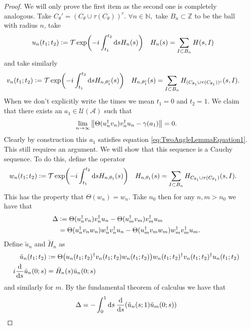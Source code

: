 \documentclass[12pt,a4paper,twoside]{article}
\renewcommand{\d}{\text{d}}
\newcommand{\defeq}{\vcentcolon=}
\let\originalleft\left
\let\originalright\right
\renewcommand{\left}{\mathopen{}\mathclose\bgroup\originalleft}
\renewcommand{\right}{\aftergroup\egroup\originalright}
\newcommand{\UU}{\mathcal U}
\newcommand{\ZZ}{\mathbb Z}
\renewcommand{\AA}{\mathcal A}
\newcommand{\NN}{\mathbb{N}}
\theoremstyle{definition}
\numberwithin{equation}{section}
\begin{document}
\begin{proof}
	We will only prove the first item as the second one is completely analogous. Take $C_\theta'=(C_\theta\cup\tau(C_\theta))^c.$ $\forall n\in\NN,$ take $B_n\subset\ZZ$ to be the ball with radius $n$, take
	\begin{align}
		u_n(t_1;t_2)&\defeq \mathcal{T}\exp(-i\int_{t_1}^{t_2} \d s H_n(s))&H_n(s)&=\sum_{I\subset B_n}H(s,I)
	\end{align}
	and take similarly
	\begin{align}
	v_n(t_1;t_2)&\defeq \mathcal{T}\exp(-i\int_{t_1}^{t_2} \d s H_{n,\theta_1^c}(s) )&H_{n,\theta_1^c}(s)&=\sum_{I\subset B_n}H_{(C_{\theta_1}\cup \tau(C_{\theta_1}))^c}(s,I).
	\end{align}
	When we don't explicitly write the times we mean $t_1=0$ and $t_2=1$. We claim that there exists an $a_1\in\UU(\AA)$ such that
	\begin{equation}
		\lim_{n\rightarrow\infty}\norm{\Theta(u_n^\dagger v_n)v_n^\dagger u_n-\gamma(a_1)}=0.
	\end{equation}
	Clearly by construction this $a_1$ satisfies equation \eqref{eq:TwoAngleLemmaEquation1}. {\color{red}This still requires an argument.} We will show that this sequence is a Cauchy sequence. To do this, define the operator
	\begin{align}
		w_n(t_1;t_2)&\defeq \mathcal{T}\exp(-i\int_{t_1}^{t_2} \d s H_{n,\theta_1}(s))&H_{n,\theta_1}(s)&=\sum_{I\subset B_n}H_{C_{\theta_1}\cup \tau(C_{\theta_1})}(s,I).
	\end{align}
	This has the property that $\Theta(w_n)=w_n$. Take $n_0$ then for any $n,m>n_0$ we have that
	\begin{align}
		\Delta&\defeq\Theta(u_n^\dagger v_n)v_n^\dagger u_n-\Theta(u_m^\dagger v_m)v_m^\dagger u_m\\
		&=\Theta(u_n^\dagger v_n w_n)w_n^\dagger v_n^\dagger u_n -\Theta(u_m^\dagger v_m w_m)w_m^\dagger v_m^\dagger u_m.
	\end{align}
	Define $\tilde{u}_n$ and $\tilde{H}_n$ as
	\begin{align}
		\tilde{u}_n(t_1;t_2)&\defeq \Theta\left(u_n(t_1;t_2)^\dagger v_n(t_1;t_2) w_n(t_1;t_2)\right)w_n(t_1;t_2)^\dagger v_n(t_1;t_2)^\dagger u_n(t_1;t_2)\\
		i\frac{\d}{\d s}\tilde{u}_n(0;s)&=\tilde{H}_n(s)\tilde{u}_n(0;s)
	\end{align}
	and similarly for $m$. By the fundamental theorem of calculus we have that
	\begin{align}
		\Delta&=-\int_0^1\d s\:\frac{\d}{\d s}\left(\tilde{u}_n(s;1)\tilde{u}_m(0;s)\right)\\

\end{align}
\end{proof}
\end{document}
